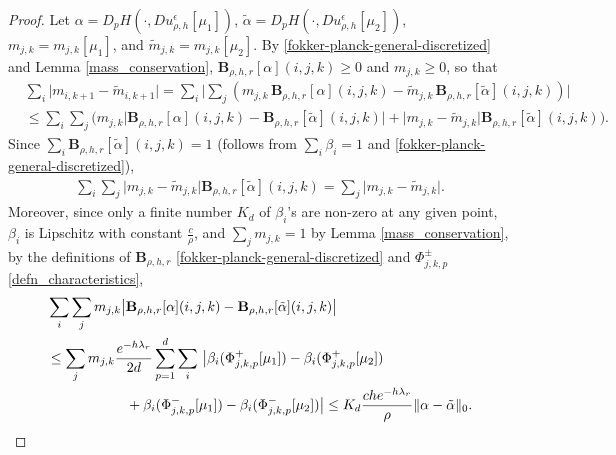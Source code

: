 \documentclass[a4paper,  twoside, 10pt, leqno]{amsart}
\theoremstyle{remark}
\theoremstyle{definition}
\begin{document}
\begin{proof}
    Let  $\alpha=D_p H(\cdot, Du^{\epsilon}_{\rho,h}[\mu_1])$, $\tilde \alpha=D_p H(\cdot, Du^{\epsilon}_{\rho,h}[\mu_2])$, 
    $m_{j,k}=m_{j,k}[\mu_1]$, and $\tilde m_{j,k}=m_{j,k}[\mu_2]$.
    By \eqref{fokker-planck-general-discretized} and Lemma \ref{mass_conservation}, 
    $\mathbf{B}_{\rho,h,r} [ \alpha ] ( i,j,k ) \geq 0$ and  $m_{j,k} \geq 0 
    $, so that
    \begin{align*}
        & \sum_{i} \big|m_{i,k+1} - \tilde{m}_{i,k+1} \big|  =  
    \sum_{i} \big| \sum_{j} ( m_{j,k}  \, \mathbf{B}_{\rho,h,r} [ \alpha ] ( i,j,k )  - \tilde m_{j,k}  \, \mathbf{B}_{\rho,h,r} [ \tilde{\alpha}  ] ( i,j,k )    ) \big| \\
      & \leq  \sum_{i} \sum_{j} \Big(  m_{j,k} \big| \mathbf{B}_{\rho,h,r} [ \alpha ] ( i,j,k ) 
    - \mathbf{B}_{\rho,h,r} [ \tilde{\alpha}  ] ( i,j,k )    \big|  +  \big| m_{j,k} - \tilde{m}_{j,k}  \big| \mathbf{B}_{\rho,h,r} [ \tilde{\alpha}  ] ( i,j,k ) \Big)  .
    \end{align*}
    Since $\sum_{i} \mathbf{B}_{\rho,h,r} [ \tilde{\alpha}  ] ( i,j,k ) = 1$ (follows from $\sum_i\beta_i=1$ and \eqref{fokker-planck-general-discretized}), 
    \begin{align*}
  \sum_{i} \sum_{j}  \big| m_{j,k} - \tilde{m}_{j,k}  \big| \mathbf{B}_{\rho,h,r} [ \tilde{\alpha}  ] ( i,j,k ) = \sum_{j} \big| m_{j,k} - \tilde{m}_{j,k} \big|. 
    \end{align*}
   Moreover, since only a finite number $K_{d}$ of $\beta_{i}$'s are non-zero at any given point,
    $\beta_{i}$ is Lipschitz with constant $\frac{c}{\rho}$, and $\sum_{j} m_{j,k}  = 1$ by Lemma \ref{mass_conservation}, by the definitions of $\mathbf{B}_{\rho,h,r}$ \eqref{fokker-planck-general-discretized} and $\Phi_{j,k,p}^{ \pm}$  \eqref{defn_characteristics},
    \begin{align*}
       & \sum_{i} \sum_{j}  m_{j,k} \big| \mathbf{B}_{\rho,h,r} [ \alpha ] ( i,j,k ) 
    - \mathbf{B}_{\rho,h,r} [ \tilde{\alpha}  ] ( i,j,k )    \big|  \\
    &\leq  \sum_{j} m_{j,k} \frac{e^{-h \lambda_{r}}}{2d} \sum_{p=1}^{d} \sum_i   \, \big| \beta_{i} ( \Phi_{j,k,p}^{+} [\mu_1] ) - \beta_{i} ( \Phi_{j,k,p}^{+} [\mu_2] )  \\
   & \hspace*{2cm}+ \beta_{i} ( \Phi_{j,k,p}^{-} [\mu_1] ) - \beta_{i} (  \Phi_{j,k,p}^{-} [\mu_2] )  \big|  \leq K_{d} \frac{c h  e^{-h \lambda_{r}}  }{\rho}  \| \alpha - \tilde{\alpha}   \|_{0} .

\end{align*}
\end{proof}
\end{document}
